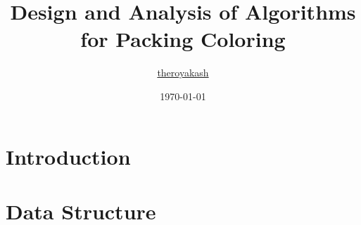 \documentclass[aspectratio=169, compress]{beamer}
\title[Packing Coloring Algorithms\hspace{0.5cm}\insertframenumber/\inserttotalframenumber]{Design and Analysis of Algorithms for Packing Coloring}
\institute{\textsc{Indian Institute of Technology Madras}}
\author{\href{https://www.theroyakash.com}{theroyakash}}
\date{\today{}}
\begin{document}
\maketitle

\section{Introduction}


\section{Data Structure}



\end{document}
